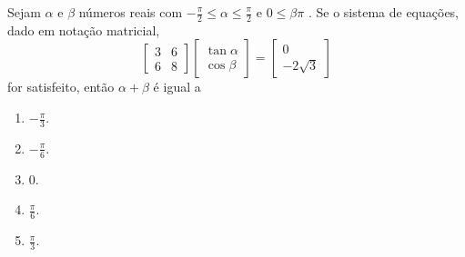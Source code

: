 \documentclass[oneside,a4paper]{amsart}
\begin{document}
\begin{questao} 
  Sejam $\alpha$ e $\beta$ números reais com
  $-\frac{\pi}{2}\leq\alpha\leq\frac{\pi}{2}$ e $0\leq\beta\pi$ . Se o
  sistema de equações, dado em notação matricial, \[
  \begin{bmatrix}
    3&6\\
    6&8
  \end{bmatrix}
  \begin{bmatrix}
    \tan\alpha\\\cos\beta
  \end{bmatrix} =
  \begin{bmatrix}
    0\\-2\sqrt{3}
  \end{bmatrix}\] for satisfeito, então $\alpha+\beta$ é igual a

  \begin{enumerate}[\bf a.]
    \item $-\frac{\pi}{3}$.
    \item $-\frac{\pi}{6}$.
    \item $0$.
    \item $\frac{\pi}{6}$.
    \item $\frac{\pi}{3}$.
  \end{enumerate}
\end{questao}
\end{document}
